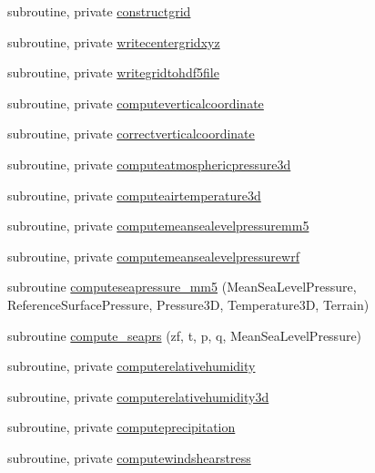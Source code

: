 \begin{DoxyCompactItemize}
\item 
subroutine, private \mbox{\hyperlink{namespacemodulewrfformat_aa3ccdff7cc5b06191d188f87afe1905a}{constructgrid}}
\item 
subroutine, private \mbox{\hyperlink{namespacemodulewrfformat_a731fdf35a2c828689a5ab27bc57be092}{writecentergridxyz}}
\item 
subroutine, private \mbox{\hyperlink{namespacemodulewrfformat_a05d05aad9544d129c314b6f52333b039}{writegridtohdf5file}}
\item 
subroutine, private \mbox{\hyperlink{namespacemodulewrfformat_a34fc2d8fa7ad6c853cc7d37d0f31fc9b}{computeverticalcoordinate}}
\item 
subroutine, private \mbox{\hyperlink{namespacemodulewrfformat_ac71176572d5f88cc34053061c13c6256}{correctverticalcoordinate}}
\item 
subroutine, private \mbox{\hyperlink{namespacemodulewrfformat_a58297fbd73eaef7ca87327428170f1aa}{computeatmosphericpressure3d}}
\item 
subroutine, private \mbox{\hyperlink{namespacemodulewrfformat_a73668be1d5f33f4ede49ed82d12aa794}{computeairtemperature3d}}
\item 
subroutine, private \mbox{\hyperlink{namespacemodulewrfformat_ab2193cc6ab00a1375b87ea785f839b04}{computemeansealevelpressuremm5}}
\item 
subroutine, private \mbox{\hyperlink{namespacemodulewrfformat_afda201375ff1c4cfb0d863734c03535c}{computemeansealevelpressurewrf}}
\item 
subroutine \mbox{\hyperlink{namespacemodulewrfformat_ad1de435678b34be1e80362a0f088aacc}{computeseapressure\+\_\+mm5}} (Mean\+Sea\+Level\+Pressure, Reference\+Surface\+Pressure, Pressure3D, Temperature3D, Terrain)
\item 
subroutine \mbox{\hyperlink{namespacemodulewrfformat_a06aace8368c071a4250a6cebdbf4bba7}{compute\+\_\+seaprs}} (zf, t, p, q, Mean\+Sea\+Level\+Pressure)
\item 
subroutine, private \mbox{\hyperlink{namespacemodulewrfformat_a9cb17629d782fef1666ac25cfe816e5e}{computerelativehumidity}}
\item 
subroutine, private \mbox{\hyperlink{namespacemodulewrfformat_a6471c4d2451b637d8c0fbc19ec57d7f7}{computerelativehumidity3d}}
\item 
subroutine, private \mbox{\hyperlink{namespacemodulewrfformat_a1c8f24f66c6b703ada552c472d71569d}{computeprecipitation}}
\item 
subroutine, private \mbox{\hyperlink{namespacemodulewrfformat_ae1dd204b5805dcd24b48624ce696dca4}{computewindshearstress}}

\end{DoxyCompactItemize}
